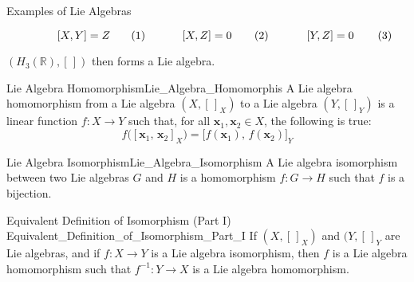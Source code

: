 \documentclass[crop=false,class=article]{standalone}                           %
\begin{document}
\begin{lexample}{Examples of Lie Algebras}
\begin{subequations}
\begin{minipage}[b]{0.32\textwidth}
                    \begin{equation}
                        [X,Y]=Z
                    \end{equation}
                \end{minipage}
                \hfill
                \begin{minipage}[b]{0.32\textwidth}
                    \begin{equation}
                        [X,Z]=0
                    \end{equation}
                \end{minipage}
                \hfill
                \begin{minipage}[b]{0.32\textwidth}
                    \begin{equation}
                        [Y,Z]=0
                    \end{equation}
                \end{minipage}
            \end{subequations}
            \par\vspace{2.5ex}
            $(H_{3}(\mathbb{R}),[\,])$ then forms a Lie algebra.
        \end{lexample}
        \begin{fdefinition}{Lie Algebra Homomorphism}{Lie_Algebra_Homomorphis}
            A Lie algebra homomorphism from a Lie algebra $(X,[\,]_{X})$ to a
            Lie algebra $(Y,[\,]_{Y})$ is a linear function
            $f:X\rightarrow{Y}$ such that, for all
            $\mathbf{x}_{1},\mathbf{x}_{2}\in{X}$, the following is true:
            \begin{equation}
                f\big([\mathbf{x}_{1},\,\mathbf{x}_{2}]_{X}\big)
                =\big[f(\mathbf{x}_{1}),\,f(\mathbf{x}_{2})\big]_{Y}
            \end{equation}
        \end{fdefinition}
        \begin{fdefinition}{Lie Algebra Isomorphism}{Lie_Algebra_Isomorphism}
            A Lie algebra isomorphism between two Lie algebras $G$ and $H$
            is a homomorphism $f:G\rightarrow{H}$ such that $f$ is a bijection.
        \end{fdefinition}
        \begin{ltheorem}{Equivalent Definition of Isomorphism (Part I)}
                        {Equivalent_Definition_of_Isomorphism_Part_I}
            If $(X,[\,]_{X})$ and $(Y,[\,]_{Y}$ are Lie algebras, and if
            $f:X\rightarrow{Y}$ is a Lie algebra isomorphism, then $f$ is
            a Lie algebra homomorphism such that
            $f^{\minus{1}}:Y\rightarrow{X}$ is a Lie algebra homomorphism.
        \end{ltheorem}
\end{document}
